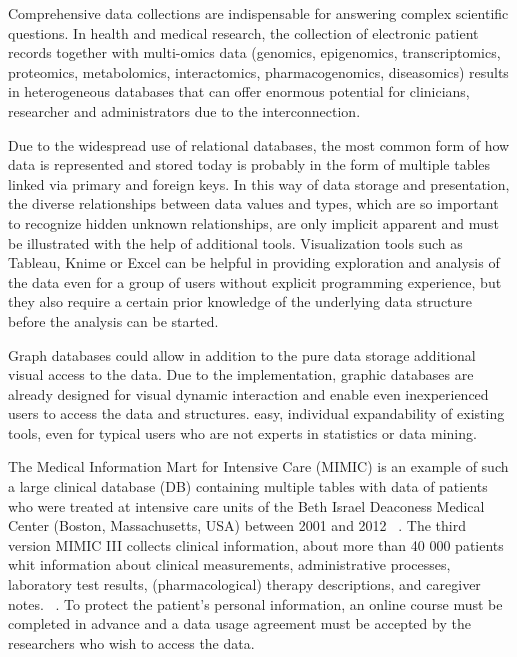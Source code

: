Comprehensive data collections are indispensable for answering complex scientific questions. In health and medical research, the collection of electronic patient records together with multi-omics data (genomics, epigenomics, transcriptomics, proteomics, metabolomics, interactomics, pharmacogenomics, diseasomics) results in heterogeneous databases that can offer enormous potential for clinicians, researcher and administrators due to the interconnection. 

Due to the widespread use of relational databases, the most common form of how data is represented and stored today is probably in the form of multiple tables linked via primary and foreign keys. In this way of data storage and presentation, the diverse relationships between data values and types, which are so important to recognize hidden unknown relationships, are only implicit apparent and must be illustrated with the help of additional tools. Visualization tools such as Tableau, Knime or Excel can be helpful in providing exploration and analysis of the data even for a group of users without explicit programming experience, but they also require a certain prior knowledge of the underlying data structure before the analysis can be started. 

Graph databases could allow in addition to the pure data storage additional visual access to the data. Due to the implementation, graphic databases are already designed for visual dynamic interaction and enable even inexperienced users to access the data and structures. easy, individual expandability of existing tools, even for typical users who are not experts in statistics or data mining. 

The Medical Information Mart for Intensive Care (MIMIC) is an example of such a large clinical database (DB) containing multiple tables with data of patients who were treated at intensive care units of the Beth Israel Deaconess Medical Center (Boston, Massachusetts, USA) between 2001 and 2012 ~\cite{Johnson.2016}. The third version MIMIC III collects clinical information, about more than 40 000 patients whit information about clinical measurements, administrative processes, laboratory test results, (pharmacological) therapy descriptions, and caregiver notes. ~\cite{Johnson.2016}. To protect the patient's personal information, an online course must be completed in advance and a data usage agreement must be accepted by the researchers who wish to access the data.




